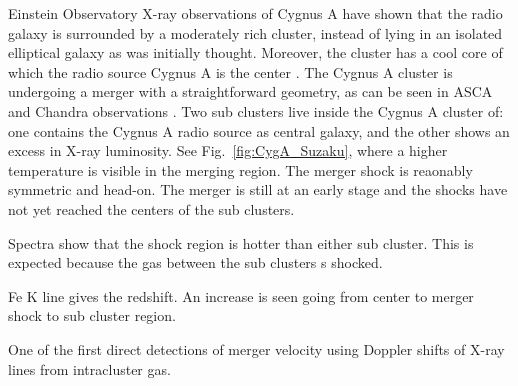 \documentclass[MScProj_TLRH_ClusterEnergy.tex]{subfiles}
\begin{document}
Einstein Observatory X-ray observations of Cygnus A have shown that the radio galaxy is surrounded by a moderately rich cluster, instead of lying in an isolated elliptical galaxy as was initially thought. Moreover, the cluster has a cool core of which the radio source Cygnus A is the center \citep{1984MNRAS.211..981A}. The Cygnus A cluster is undergoing a merger with a straightforward geometry, as can be seen in ASCA and Chandra observations \citep{1999ApJ...521..526M, 2002ApJ...565..195S}. Two sub clusters live inside the Cygnus A cluster of: one contains the Cygnus A radio source as central galaxy, and the other shows an excess in X-ray luminosity. See Fig.~\ref{fig:CygA_Suzaku}, where a higher temperature is visible in the merging region. The merger shock is reaonably symmetric and head-on. The merger is still at an early stage and the shocks have not yet reached the centers of the sub clusters.

Spectra show that the shock region is hotter than either sub cluster. This is expected because the gas between the sub clusters s shocked.

Fe K line gives the redshift. An increase is seen going from center to merger shock to sub cluster region.

One of the first direct detections of merger velocity using Doppler shifts of X-ray lines from intracluster gas.





\SubfileBibliography
\end{document}
